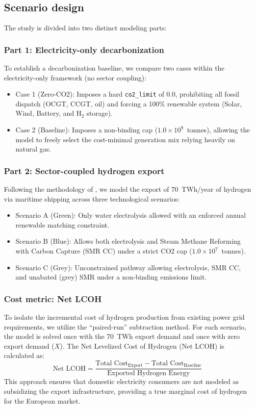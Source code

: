 \documentclass[preprint,12pt]{elsarticle}
\begin{document}
\subsection{Scenario design}
The study is divided into two distinct modeling parts:

\subsubsection{Part 1: Electricity-only decarbonization}
To establish a decarbonization baseline, we compare two cases within the electricity-only framework (no sector coupling):
\begin{itemize}
    \item {Case 1 (Zero-CO2):} Imposes a hard \texttt{co2\_limit} of 0.0, prohibiting all fossil dispatch (OCGT, CCGT, oil) and forcing a 100\% renewable system (Solar, Wind, Battery, and $\text{H}_2$ storage).
    \item {Case 2 (Baseline):} Imposes a non-binding cap ($1.0 \times 10^9$~tonnes), allowing the model to freely select the cost-minimal generation mix relying heavily on natural gas.
\end{itemize}

\subsubsection{Part 2: Sector-coupled hydrogen export}
Following the methodology of \cite{abdelkhalek2025pypsa}, we model the export of {70~TWh/year} of hydrogen via maritime shipping across three technological scenarios:
\begin{itemize}
    \item {Scenario A (Green):} Only water electrolysis allowed with an enforced annual renewable matching constraint.
    \item {Scenario B (Blue):} Allows both electrolysis and Steam Methane Reforming with Carbon Capture (SMR CC) under a strict CO2 cap ($1.0 \times 10^7$~tonnes).
    \item {Scenario C (Grey):} Unconstrained pathway allowing electrolysis, SMR CC, and unabated (grey) SMR under a non-binding emissions limit.
\end{itemize}


\subsubsection{Cost metric: Net LCOH}
To isolate the incremental cost of hydrogen production from existing power grid requirements, we utilize the ``paired-run'' subtraction method. For each scenario, the model is solved once with the 70~TWh export demand and once with zero export demand ($X$). The Net Levelized Cost of Hydrogen (Net LCOH) is calculated as:
\begin{equation}
    \text{Net LCOH} = \frac{\text{Total Cost}_{\text{Export}} - \text{Total Cost}_{\text{Baseline}}}{\text{Exported Hydrogen Energy}}
\end{equation}
This approach ensures that domestic electricity consumers are not modeled as subsidizing the export infrastructure, providing a true marginal cost of hydrogen for the European market.
\end{document}
